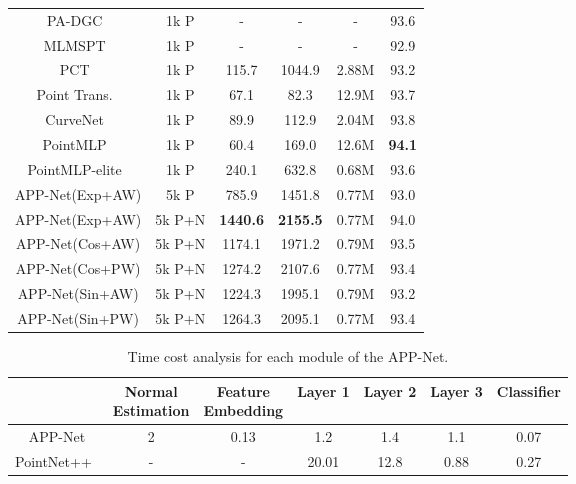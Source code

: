 \documentclass[journal]{IEEEtran}
\begin{document}
\begin{table*}[t]
\begin{center}
\begin{tabular}{c|c|c|c|c|c}
PA-DGC~\cite{xu2021paconv}&1k P&-&-&-&93.6\\
MLMSPT~\cite{han2021point}&1k P&-&-&-&92.9\\
PCT~\cite{guo2021pct}&1k P&115.7&1044.9&2.88M&93.2\\
Point Trans.~\cite{zhao2021point}&1k P&67.1&82.3&12.9M&93.7\\
CurveNet~\cite{muzahid2020curvenet}&1k P&89.9&112.9&2.04M&{93.8}\\
PointMLP~\cite{ma2022rethinking}&1k P&60.4&169.0&12.6M&{\bf94.1}\\
PointMLP-elite~\cite{ma2022rethinking}&1k P&240.1&632.8&{0.68M}&93.6\\ \hline
APP-Net(Exp+AW)& 5k P&{785.9}&{1451.8}&0.77M&93.0\\ \hline
APP-Net(Exp+AW) & 5k P+N&{\bf1440.6}&{\bf 2155.5}&{0.77M}& 94.0    \\
APP-Net(Cos+AW) & 5k P+N&1174.1&1971.2&0.79M& 93.5    \\
APP-Net(Cos+PW) & 5k P+N&1274.2&2107.6&0.77M& 93.4    \\
APP-Net(Sin+AW) & 5k P+N&1224.3&1995.1&0.79M& 93.2    \\
APP-Net(Sin+PW) & 5k P+N&1264.3&2095.1&0.77M& 93.4    \\ 
\hline

\end{tabular}
\end{center}
\end{table*}

\begin{table*}[t]
	\caption{Time cost analysis for each module of the APP-Net.}\label{tab:timeanalysis}
\begin{center}
\begin{tabular}{c|c|c|c|c|c|c}
\hline
     & \makecell[c]{Normal\\ Estimation}&\makecell[c] {Feature \\ Embedding} & Layer 1 & Layer 2 & Layer 3 & Classifier \\ \hline
APP-Net   & 2     & 0.13              &     1.2                       & 1.4             & 1.1   & 0.07    \\ \hline
PointNet++~\cite{PointNet++}&-&-&20.01&12.8&0.88&0.27\\
\hline
\end{tabular}
\end{center}
\end{table*}
               
\end{document}
